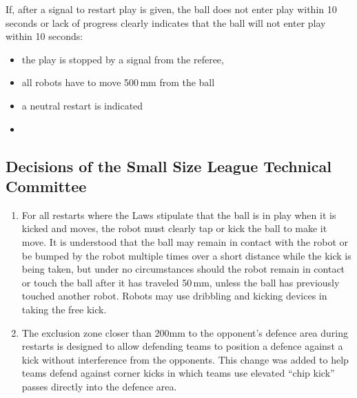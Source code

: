 If, after a signal to restart play is given, the ball does not enter play within 10 seconds\removed{,} or lack of progress clearly indicates that the ball will not enter play within 10 seconds:
\begin{itemize}
\item the play is stopped by a signal from the referee,
\item all robots have to move 500\,mm from the ball
\item a neutral restart is indicated
\item {}
\end{itemize}

\subsection*{Decisions of the Small Size League Technical Committee}
\begin{enumerate}
\item
For all restarts where the Laws stipulate that the ball is in play when it is kicked and moves, the robot must clearly tap or kick the ball to make it move.
It is understood that the ball may remain in contact with the robot or be bumped by the robot multiple times over a short distance while the kick is being taken, but under no circumstances should the robot remain in contact or touch the ball after it has traveled 50\,mm, unless the ball has previously touched another robot.
Robots may use dribbling and kicking devices in taking the free kick.

\item
The exclusion zone closer than 200\added{\,}mm to the opponent's defence area during restarts is designed to allow defending teams to position a defence against a kick without interference from the opponents.
This change was added to help teams defend against corner kicks in which teams use elevated ``chip kick'' passes directly into the defence area.
\end{enumerate}
